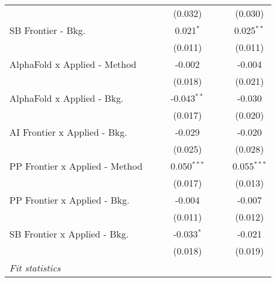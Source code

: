 \begin{tabular}{lcccccc}
                                  &              &               & (0.032)       &               &               & (0.030)\\   
   SB Frontier - Bkg.             &              &               & 0.021$^{*}$   &               &               & 0.025$^{**}$\\   
                                  &              &               & (0.011)       &               &               & (0.011)\\   
   AlphaFold x Applied - Method   &              &               & -0.002        &               &               & -0.004\\   
                                  &              &               & (0.018)       &               &               & (0.021)\\   
   AlphaFold x Applied - Bkg.     &              &               & -0.043$^{**}$ &               &               & -0.030\\   
                                  &              &               & (0.017)       &               &               & (0.020)\\   
   AI Frontier x Applied - Bkg.   &              &               & -0.029        &               &               & -0.020\\   
                                  &              &               & (0.025)       &               &               & (0.028)\\   
   PP Frontier x Applied - Method &              &               & 0.050$^{***}$ &               &               & 0.055$^{***}$\\   
                                  &              &               & (0.017)       &               &               & (0.013)\\   
   PP Frontier x Applied - Bkg.   &              &               & -0.004        &               &               & -0.007\\   
                                  &              &               & (0.011)       &               &               & (0.012)\\   
   SB Frontier x Applied - Bkg.   &              &               & -0.033$^{*}$  &               &               & -0.021\\   
                                  &              &               & (0.018)       &               &               & (0.019)\\   
   \midrule
   \emph{Fit statistics}\\

\end{tabular}
